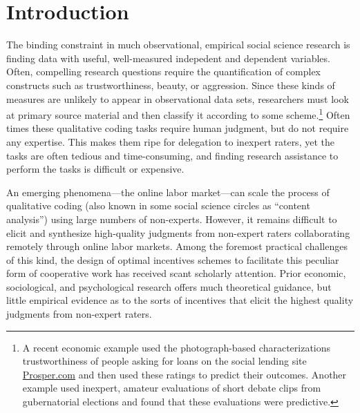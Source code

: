 \documentclass{chi2009}
\begin{document}
\section{Introduction}
The binding constraint in much observational, empirical social
science research is finding data with useful, well-measured indepedent
and dependent variables. Often, compelling research questions require the quantification of complex constructs such as trustworthiness, beauty, or aggression. Since these kinds of measures are unlikely to appear in observational data sets, researchers must look at primary source material and then classify it according to some scheme.\footnote{A recent economic
  example used the photograph-based characterizations trustworthiness
  of people asking for loans on the social lending site
  \href{http://www.prosper.com}{Prosper.com} and then used these
  ratings to predict their outcomes\cite{duarte2009tc}. Another
  example used inexpert, amateur evaluations of short debate clips
  from gubernatorial elections and found that these evaluations were
  predictive\cite{benjamin2009}.} Often times these qualitative coding tasks require human judgment, but do not require any expertise. This makes them ripe for delegation to inexpert raters, yet the tasks are often tedious and time-consuming, and finding research assistance to perform the tasks is difficult or expensive. 

An emerging phenomena---the online labor market---can scale the process of qualitative coding (also known in some social science circles as ``content analysis'') using large numbers of non-experts. However, it remains difficult to elicit and synthesize high-quality judgments from non-expert raters collaborating remotely through online labor markets. Among the foremost practical challenges of this kind, the design of optimal incentives schemes to facilitate this peculiar form of cooperative work has received scant scholarly attention. Prior economic, sociological, and psychological research offers much theoretical guidance, but little empirical evidence as to the sorts of incentives that elicit the highest quality judgments from non-expert raters. 
\end{document}
